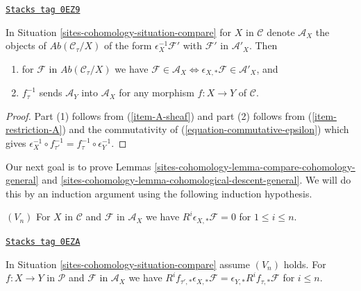 \begin{lemma}[A]
\label{sites-cohomology-lemma-A}
\href{https://stacks.math.columbia.edu/tag/0EZ9}{\texttt{Stacks tag 0EZ9}}

In Situation \ref{sites-cohomology-situation-compare} for $X$ in $\mathcal{C}$
denote $\mathcal{A}_X$
the objects of $\textit{Ab}(\mathcal{C}_\tau/X)$ of the form
$\epsilon_X^{-1}\mathcal{F}'$ with $\mathcal{F}'$ in $\mathcal{A}'_X$.
Then
\begin{enumerate}
\item for $\mathcal{F}$ in $\textit{Ab}(\mathcal{C}_\tau/X)$
we have $\mathcal{F} \in \mathcal{A}_X \Leftrightarrow
\epsilon_{X, *}\mathcal{F} \in \mathcal{A}'_X$, and
\item $f_\tau^{-1}$ sends $\mathcal{A}_Y$ into $\mathcal{A}_X$
for any morphism $f : X \to Y$ of $\mathcal{C}$.
\end{enumerate}
\end{lemma}

\begin{proof}
Part (1) follows from (\ref{item-A-sheaf}) and part (2)
follows from (\ref{item-restriction-A}) and
the commutativity of (\ref{equation-commutative-epsilon}) which gives
$\epsilon_X^{-1} \circ f_{\tau'}^{-1} = f_\tau^{-1} \circ \epsilon_Y^{-1}$.
\end{proof}

Our next goal is to prove Lemmas \ref{sites-cohomology-lemma-compare-cohomology-general} and
\ref{sites-cohomology-lemma-cohomological-descent-general}. We will do this by an induction
argument using the following induction hypothesis.

\medskip\noindent
$(V_n)$ For $X$ in $\mathcal{C}$ and $\mathcal{F}$ in $\mathcal{A}_X$
we have $R^i\epsilon_{X, *}\mathcal{F} = 0$ for $1 \leq i \leq n$.

\begin{lemma}
\label{sites-cohomology-lemma-V-implies-C-general}
\href{https://stacks.math.columbia.edu/tag/0EZA}{\texttt{Stacks tag 0EZA}}

In Situation \ref{sites-cohomology-situation-compare} assume $(V_n)$ holds.
For $f : X \to Y$ in $\mathcal{P}$ and $\mathcal{F}$ in $\mathcal{A}_X$
we have $R^if_{\tau', *}\epsilon_{X, *}\mathcal{F} =
\epsilon_{Y, *}R^if_{\tau, *}\mathcal{F}$ for $i \leq n$.
\end{lemma}

